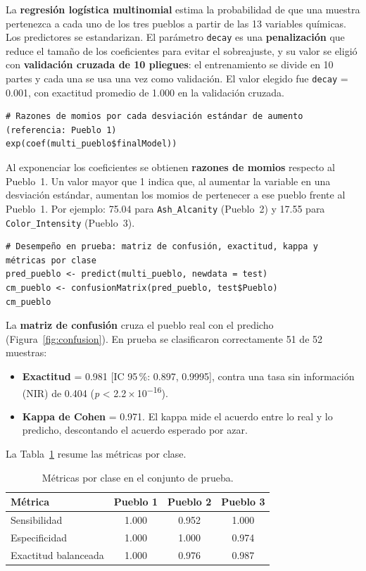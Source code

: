 \documentclass[10pt,letterpaper,twocolumn]{article}
\newcommand{\var}[1]{\texttt{#1}}
\newcommand{\pval}{\textit{p}}
\newcommand{\sci}[2]{#1\,×\,10\textsuperscript{−#2}}
\begin{document}
La \textbf{regresión logística multinomial} estima la probabilidad de que una muestra pertenezca a cada uno de los tres pueblos a partir de las 13 variables químicas. Los predictores se estandarizan. El parámetro \var{decay} es una \textbf{penalización} que reduce el tamaño de los coeficientes para evitar el sobreajuste, y su valor se eligió con \textbf{validación cruzada de 10 pliegues}: el entrenamiento se divide en 10 partes y cada una se usa una vez como validación. El valor elegido fue \var{decay} = 0.001, con exactitud promedio de 1.000 en la validación cruzada.

\begin{lstlisting}[firstnumber=619]
# Razones de momios por cada desviación estándar de aumento (referencia: Pueblo 1)
exp(coef(multi_pueblo$finalModel))
\end{lstlisting}

Al exponenciar los coeficientes se obtienen \textbf{razones de momios} respecto al Pueblo~1. Un valor mayor que 1 indica que, al aumentar la variable en una desviación estándar, aumentan los momios de pertenecer a ese pueblo frente al Pueblo~1. Por ejemplo: 75.04 para \var{Ash\_Alcanity} (Pueblo~2) y 17.55 para \var{Color\_Intensity} (Pueblo~3).

\begin{lstlisting}[firstnumber=622]
# Desempeño en prueba: matriz de confusión, exactitud, kappa y métricas por clase
pred_pueblo <- predict(multi_pueblo, newdata = test)
cm_pueblo <- confusionMatrix(pred_pueblo, test$Pueblo)
cm_pueblo
\end{lstlisting}

La \textbf{matriz de confusión} cruza el pueblo real con el predicho (Figura~\ref{fig:confusion}). En prueba se clasificaron correctamente 51 de 52 muestras:
\begin{itemize}
  \item \textbf{Exactitud} = 0.981 [IC 95\,\%: 0.897, 0.9995], contra una tasa sin información (NIR) de 0.404 (\pval{} < \sci{2.2}{16}).
  \item \textbf{Kappa de Cohen} = 0.971. El kappa mide el acuerdo entre lo real y lo predicho, descontando el acuerdo esperado por azar.
\end{itemize}
La Tabla~\ref{tab:clases} resume las métricas por clase.

\begin{table}[htbp]
  \centering
  \caption{Métricas por clase en el conjunto de prueba.}
  \label{tab:clases}
  \footnotesize
  \begin{tabular}{@{}lccc@{}}
    \toprule
    \textbf{Métrica} & \textbf{Pueblo 1} & \textbf{Pueblo 2} & \textbf{Pueblo 3} \\
    \midrule
    Sensibilidad         & 1.000 & 0.952 & 1.000 \\
    Especificidad        & 1.000 & 1.000 & 0.974 \\
    Exactitud balanceada & 1.000 & 0.976 & 0.987 \\
    \bottomrule
  \end{tabular}
\end{table}
\end{document}
